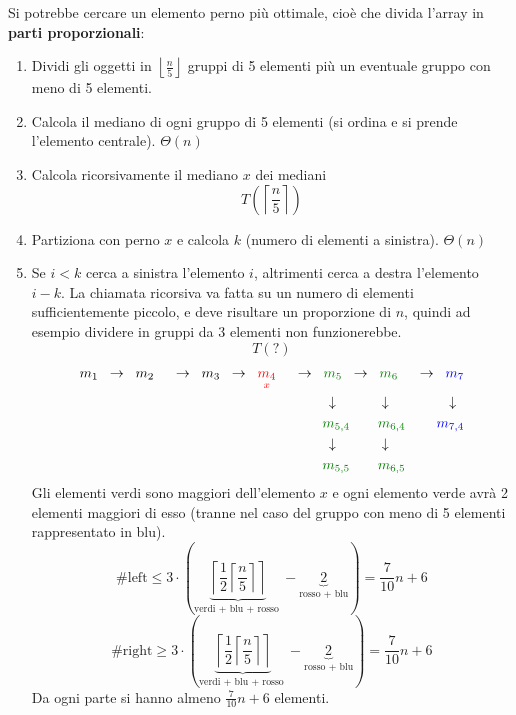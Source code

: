 \documentclass[a4paper]{article}
\begin{document}
Si potrebbe cercare un elemento perno più ottimale, cioè che divida l'array in
\textbf{parti proporzionali}:
\begin{enumerate}
  \item Dividi gli oggetti in \( \left\lfloor \frac{n}{5} \right\rfloor \) gruppi di
    5 elementi più un eventuale gruppo con meno di 5 elementi.

  \item Calcola il mediano di ogni gruppo di 5 elementi (si ordina e si prende l'elemento
    centrale). \( \Theta(n) \)

  \item Calcola ricorsivamente il mediano \( x \) dei mediani
    \[
      T\left(\left\lceil \frac{n}{5} \right\rceil\right)
    \] 

  \item Partiziona con perno \( x \) e calcola \( k \) (numero di elementi a sinistra).
    \( \Theta (n) \) 

  \item Se \( i<k \) cerca a sinistra l'elemento \( i \), altrimenti cerca a destra
    l'elemento \( i-k \). La chiamata ricorsiva va fatta su un numero di elementi
    sufficientemente piccolo, e deve risultare un proporzione di \( n \), quindi
    ad esempio dividere in gruppi da 3 elementi non funzionerebbe.
    \[
    T(?)
    \] 
    \[
      \begin{aligned}
        m_1 \;\;&\to\;\; m_2 \;\;&\to\;\; m_3 \;\;&\to\;\; \color{red}\underset{x}{m_4} \;\;&\to\;\; \color{green!50!black}m_5
        \;\;&\to\;\; \color{green!50!black}m_6 \;\;&\to\;\; \color{blue}m_7\\
             &&&& \downarrow \quad&\qquad \downarrow &\downarrow \;\;\\
             &&&& \color{green!50!black}m_{5,4} &\qquad \color{green!50!black}m_{6,4} & \color{blue}m_{7,4} \\
             &&&& \downarrow \quad&\qquad \downarrow &\\
             &&&& \color{green!50!black}m_{5,5} &\qquad \color{green!50!black}m_{6,5} & \\
      \end{aligned}
    \] 
    Gli elementi verdi sono maggiori dell'elemento \( x \) e ogni elemento verde avrà
    2 elementi maggiori di esso (tranne nel caso del gruppo con meno di 5 elementi
    rappresentato in blu).
    \[
      \text{\#left} \le 3 \cdot  \left(\underbrace{\left\lceil \frac{1}{2} \left\lceil \frac{n}{5} \right\rceil  \right\rceil}_{\text{
          verdi + blu + rosso
      }} - \underbrace{2}_{\text{rosso + blu}} \right) 
      = \frac{7}{10} n + 6
    \] 
    \[
      \text{\#right} \ge 3 \cdot  \left(\underbrace{\left\lceil \frac{1}{2} \left\lceil \frac{n}{5} \right\rceil  \right\rceil}_{\text{
          verdi + blu + rosso
      }} - \underbrace{2}_{\text{rosso + blu}} \right) 
      = \frac{7}{10} n + 6
    \] 
    Da ogni parte si hanno almeno \( \frac{7}{10} n + 6 \) elementi.


\end{enumerate}
\end{document}

